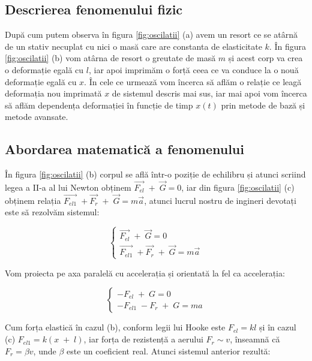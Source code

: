 \documentclass[12pt, a4paper]{article}
\begin{document}
\subsection{Descrierea fenomenului fizic}
\hspace{0.4cm}După cum putem observa în figura \ref{fig:oscilatii} (a) avem un resort ce se atârnă de un stativ necuplat cu nici o masă care are constanta de elasticitate $k$. În figura \ref{fig:oscilatii} (b) vom atârna de resort o greutate de masă $m$ și acest corp va crea o deformație egală cu $l$, iar apoi imprimăm o forță ceea ce va conduce la o nouă deformație egală cu $x$. În cele ce urmează vom încerca să aflăm o relație ce leagă deformația nou imprimată $x$ de sistemul descris mai sus, iar mai apoi vom încerca să aflăm dependența deformației în funcție de timp $x(t)$ prin metode de bază și metode avansate.
\newpage
\subsection{Abordarea matematică a fenomenului}
\hspace{0.6cm}În figura \ref{fig:oscilatii} (b) corpul se află într-o poziție de echilibru și atunci scriind legea a II-a al lui Newton obținem $\overrightarrow{F_{el}}\;+\;\overrightarrow{G} = 0$, iar din figura \ref{fig:oscilatii} (c) obținem relația $\overrightarrow{F_{el1}}\;+\overrightarrow{F_{r}}\;+\;\overrightarrow{G} = m\overrightarrow{a}$, atunci lucrul nostru de ingineri devotați este să rezolvăm sistemul:

\begin{equation}
\left\{
    \begin{array}{lr}
        \overrightarrow{F_{el}}\;+\;\overrightarrow{G} = 0\\
        \overrightarrow{F_{el1}}\;+\overrightarrow{F_{r}}\;+\;\overrightarrow{G} = m\overrightarrow{a}
    \end{array}
\right.
\end{equation}

Vom proiecta pe axa paralelă cu accelerația și orientată la fel ca accelerația:

\begin{equation}
\left\{
    \begin{array}{lr}
        -F_{el}\;+\;G = 0\\
        -F_{el1}\;-F_{r}\;+\;G = ma
    \end{array}
\right.
\end{equation}

Cum forța elastică în cazul (b), conform legii lui Hooke este $F_{el} = kl$ și în cazul (c) $F_{el1} = k(x\;+\;l)$, iar forța de rezistență a aerului $F_{r} \sim v$, înseamnă că $F_{r} = \beta v$, unde $\beta$ este un coeficient real. Atunci sistemul anterior rezultă:
\end{document}
